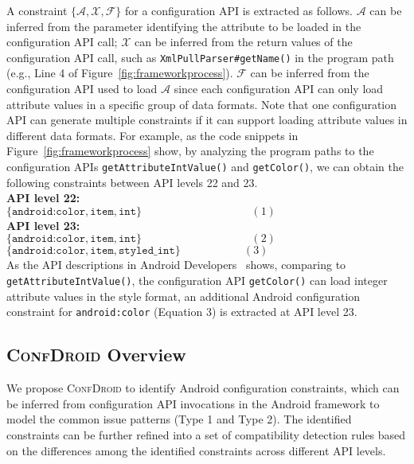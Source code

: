 A constraint $\{\mathcal{A}, \mathcal{X}, \mathcal{F}\}$ for a configuration
API is extracted as follows.  $\mathcal{A}$ can be inferred from the
parameter identifying the attribute to be loaded in the configuration API call;
$\mathcal{X}$ can be inferred from the return values of the configuration API
call, such as \texttt{XmlPullParser\#getName()} in the program path (e.g., Line 4 of Figure~\ref{fig:frameworkprocess}).
$\mathcal{F}$ can be inferred from
the configuration API used to load $\mathcal{A}$ since each configuration API can only load attribute values in a specific group of data formats.
Note that one configuration API can generate multiple constraints if it can support loading attribute values in different data formats.
For example, as the code snippets in Figure~\ref{fig:frameworkprocess} show, by
analyzing the program paths to the configuration APIs
\texttt{getAttributeIntValue()} and
\texttt{getColor()}, we can obtain the following constraints
between API levels 22 and 23.
\\
\textbf{API level 22:}\\
$\{\texttt{android:color}, \texttt{item}, \texttt{int}\}\,\,\,\,\,\,\,\,\,\,\,\,\,\,\,\,\,\,\,\,\,\,\,\,\,\,\,\,\,\,\,\,\,\,\,\,\,\,\,\,\,\,\,\,\,\,\,\,\,\,\,\,\,\,\,\,\,\,\,                  (1)$\\
\textbf{API level 23:} \\
$\{\texttt{android:color}, \texttt{item}, \texttt{int}\} \,\,\,\,\,\,\,\,\,\,\,\,\,\,\,\,\,\,\,\,\,\,\,\,\,\,\,\,\,\,\,\,\,\,\,\,\,\,\,\,\,\,\,\,\,\,\,\,\,\,\,\,\,\,\,\,\,\,\,(2)$\\
$\{\texttt{android:color}, \texttt{item}, \texttt{styled\_int}\}\,\,\,\,\,\,\,\,\,\,\,\,\,\,\,\,\,\,\,\,\,\,\,\,\,\,\,\,\,\,\,\,\,\,(3)$\\

As the API descriptions in Android Developers~\cite{androiddevelopers} shows, comparing to \texttt{getAttributeIntValue()}, the configuration API \texttt{getColor()} can load integer attribute values in the style format, an additional Android configuration constraint for \texttt{android:color} (Equation 3) is extracted at API level 23.

\subsection{\textsc{ConfDroid} Overview}
We propose \textsc{ConfDroid} to identify Android configuration constraints, which can be inferred from configuration API invocations in the Android framework to model the common issue patterns (Type 1 and Type 2). 
The identified constraints can be further refined into a set of compatibility detection rules based on the differences among the identified constraints across different API levels.

